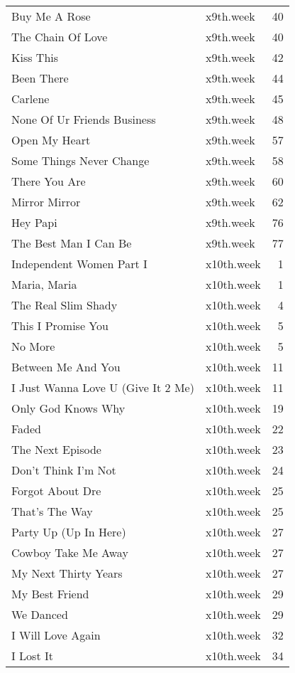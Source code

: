 \begin{table}[ht]
\begin{tabular}{llr}
  Buy Me A Rose & x9th.week &  40 \\ 
  The Chain Of Love & x9th.week &  40 \\ 
  Kiss This & x9th.week &  42 \\ 
  Been There & x9th.week &  44 \\ 
  Carlene & x9th.week &  45 \\ 
  None Of Ur Friends Business & x9th.week &  48 \\ 
  Open My Heart & x9th.week &  57 \\ 
  Some Things Never Change & x9th.week &  58 \\ 
  There You Are & x9th.week &  60 \\ 
  Mirror Mirror & x9th.week &  62 \\ 
  Hey Papi & x9th.week &  76 \\ 
  The Best Man I Can Be & x9th.week &  77 \\ 
  Independent Women Part I & x10th.week &   1 \\ 
  Maria, Maria & x10th.week &   1 \\ 
  The Real Slim Shady & x10th.week &   4 \\ 
  This I Promise You & x10th.week &   5 \\ 
  No More & x10th.week &   5 \\ 
  Between Me And You & x10th.week &  11 \\ 
  I Just Wanna Love U (Give It 2 Me) & x10th.week &  11 \\ 
  Only God Knows Why & x10th.week &  19 \\ 
  Faded & x10th.week &  22 \\ 
  The Next Episode & x10th.week &  23 \\ 
  Don't Think I'm Not & x10th.week &  24 \\ 
  Forgot About Dre & x10th.week &  25 \\ 
  That's The Way & x10th.week &  25 \\ 
  Party Up (Up In Here) & x10th.week &  27 \\ 
  Cowboy Take Me Away & x10th.week &  27 \\ 
  My Next Thirty Years & x10th.week &  27 \\ 
  My Best Friend & x10th.week &  29 \\ 
  We Danced & x10th.week &  29 \\ 
  I Will Love Again & x10th.week &  32 \\ 
  I Lost It & x10th.week &  34 \\ 

\end{tabular}
\end{table}

